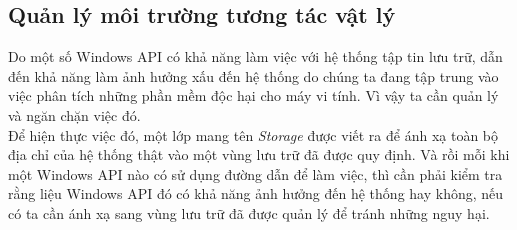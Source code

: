 	\subsection{Quản lý môi trường tương tác vật lý}

Do một số Windows API có khả năng làm việc với hệ thống tập tin lưu trữ, dẫn đến khả năng làm ảnh hưởng xấu đến hệ thống do chúng ta đang tập trung vào việc phân tích những phần mềm độc hại cho máy vi tính. Vì vậy ta cần quản lý và ngăn chặn việc đó.\\

Để hiện thực việc đó, một lớp mang tên \textit{Storage} được viết ra để ánh xạ toàn bộ địa chỉ của hệ thống thật vào một vùng lưu trữ đã được quy định. Và rồi mỗi khi một Windows API nào có sử dụng đường dẫn để làm việc, thì cần phải kiểm tra rằng liệu Windows API đó có khả năng ảnh hưởng đến hệ thống hay không, nếu có ta cần ánh xạ sang vùng lưu trữ đã được quản lý để tránh những nguy hại.
